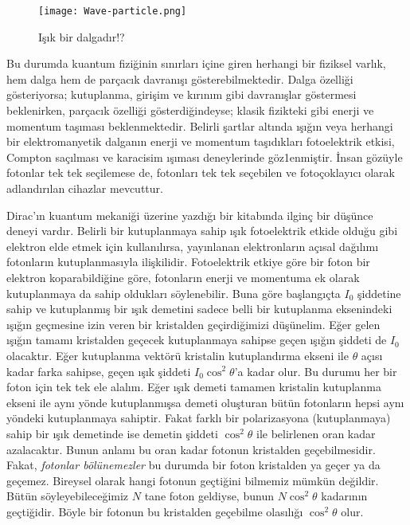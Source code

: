 \documentclass[a4paper,12pt, twoside]{article}
\begin{document}
\begin{figure}[hbtp]
\center
\texttt{[image: Wave-particle.png]}
\caption{Işık bir dalgadır!?}
\label{fig:light_is_a_wave}
\end{figure}

Bu durumda kuantum fiziğinin sınırları içine giren herhangi bir fiziksel varlık, hem dalga hem de parçacık davranışı gösterebilmektedir. Dalga özelliği gösteriyorsa; kutuplanma, girişim ve kırınım gibi davranışlar göstermesi beklenirken, parçacık özelliği gösterdiğindeyse; klasik fizikteki gibi enerji ve momentum taşıması beklenmektedir. Belirli şartlar altında ışığın veya herhangi bir elektromanyetik dalganın enerji ve momentum taşıdıkları fotoelektrik etkisi, Compton saçılması ve karacisim ışıması deneylerinde göz1enmiştir. İnsan gözüyle fotonlar tek tek seçilemese de, fotonları tek tek seçebilen ve fotoçoklayıcı \cite{book:Gasiorowicz} olarak adlandırılan cihazlar mevcuttur. 

Dirac'ın kuantum mekaniği üzerine yazdığı bir kitabında ilginç bir düşünce deneyi vardır. Belirli bir kutuplanmaya sahip ışık fotoelektrik etkide olduğu gibi elektron elde etmek için kullanılırsa, yayınlanan elektronların açısal dağılımı fotonların kutuplanmasıyla ilişkilidir. Fotoelektrik etkiye göre bir foton bir elektron koparabildiğine göre, fotonların enerji ve momentuma ek olarak kutuplanmaya da sahip oldukları söylenebilir. Buna göre başlangıçta $I_0$ şiddetine sahip ve kutuplanmış bir ışık demetini sadece belli bir kutuplanma eksenindeki ışığın geçmesine izin veren bir kristalden geçirdiğimizi düşünelim. Eğer gelen ışığın tamamı kristalden geçecek kutuplanmaya sahipse geçen ışığın şiddeti de $I_0$ olacaktır. Eğer kutuplanma vektörü kristalin kutuplandırma ekseni ile $\theta$ açısı kadar farka sahipse, geçen ışık şiddeti $I_0 \cos^2 \theta$'a kadar olur. Bu durumu her bir foton için tek tek ele alalım. Eğer ışık demeti tamamen kristalin kutuplanma ekseni ile aynı yönde kutuplanmışsa demeti oluşturan bütün fotonların hepsi aynı yöndeki kutuplanmaya sahiptir. Fakat farklı bir polarizasyona (kutuplanmaya) sahip bir ışık demetinde ise demetin şiddeti  $\cos^2 \theta$ ile belirlenen oran kadar azalacaktır. Bunun anlamı bu oran kadar fotonun kristalden geçebilmesidir. Fakat, \emph{fotonlar bölünemezler} bu durumda bir foton kristalden ya geçer ya da geçemez. Bireysel olarak hangi fotonun geçtiğini bilmemiz mümkün değildir. Bütün söyleyebileceğimiz $N$ tane foton geldiyse, bunun $N \cos^2 \theta$ kadarının geçtiğidir. Böyle bir fotonun bu kristalden geçebilme olasılığı $\cos^2\theta$ olur.
\end{document}
